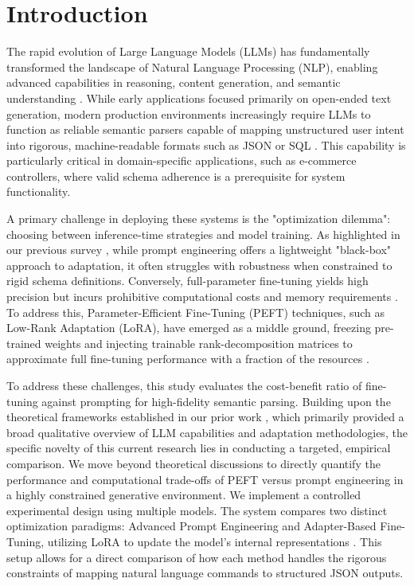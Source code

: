\documentclass[journal,article,submit,pdftex,moreauthors]{Definitions/mdpi}
\begin{document}


\section{Introduction}

The rapid evolution of Large Language Models (LLMs) has fundamentally transformed the landscape of Natural Language Processing (NLP), enabling advanced capabilities in reasoning, content generation, and semantic understanding \citep{ling2025domain}. While early applications focused primarily on open-ended text generation, modern production environments increasingly require LLMs to function as reliable semantic parsers capable of mapping unstructured user intent into rigorous, machine-readable formats such as JSON or SQL \citep{han2024parameter}. This capability is particularly critical in domain-specific applications, such as e-commerce controllers, where valid schema adherence is a prerequisite for system functionality.

A primary challenge in deploying these systems is the "optimization dilemma": choosing between inference-time strategies and model training. As highlighted in our previous survey \citep{karlovic2025large}, while prompt engineering offers a lightweight "black-box" approach to adaptation, it often struggles with robustness when constrained to rigid schema definitions. Conversely, full-parameter fine-tuning yields high precision but incurs prohibitive computational costs and memory requirements \citep{mundra2024comprehensive}. To address this, Parameter-Efficient Fine-Tuning (PEFT) techniques, such as Low-Rank Adaptation (LoRA), have emerged as a middle ground, freezing pre-trained weights and injecting trainable rank-decomposition matrices to approximate full fine-tuning performance with a fraction of the resources \citep{hu2023llm}.

To address these challenges, this study evaluates the cost-benefit ratio of fine-tuning against prompting for high-fidelity semantic parsing. Building upon the theoretical frameworks established in our prior work \citep{karlovic2025large}, which primarily provided a broad qualitative overview of LLM capabilities and adaptation methodologies, the specific novelty of this current research lies in conducting a targeted, empirical comparison. We move beyond theoretical discussions to directly quantify the performance and computational trade-offs of PEFT versus prompt engineering in a highly constrained generative environment. We implement a controlled experimental design using multiple models. The system compares two distinct optimization paradigms: Advanced Prompt Engineering and Adapter-Based Fine-Tuning, utilizing LoRA to update the model's internal representations \citep{patil2025analyzing}. This setup allows for a direct comparison of how each method handles the rigorous constraints of mapping natural language commands to structured JSON outputs.
\end{document}
